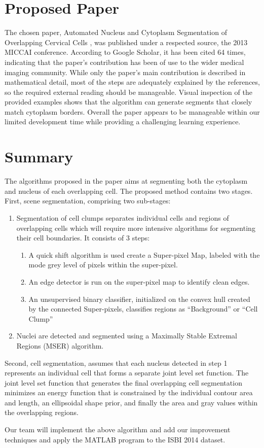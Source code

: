 \documentclass[12pt, letter]{article}
\begin{document}
\section{Proposed Paper}
The chosen paper, Automated Nucleus and Cytoplasm Segmentation of Overlapping Cervical Cells \cite{main}, was published under a respected source, the 2013 MICCAI conference.  According to Google Scholar, it has been cited 64 times, indicating that the paper’s contribution has been of use to the wider medical imaging community.  While only the paper’s main contribution is described in mathematical detail, most of the steps are adequately explained by the references, so the required external reading should be manageable.  Visual inspection of the provided examples shows that the algorithm can generate segments that closely match cytoplasm borders.  Overall the paper appears to be manageable within our limited development time while providing a challenging learning experience.

\section{Summary}

The algorithms proposed in the paper aims at segmenting both the cytoplasm and nucleus of each overlapping cell. The proposed method contains two stages. First, scene segmentation, comprising two sub-stages: 

\begin{enumerate}
    \item  Segmentation of cell clumps separates individual cells and regions of overlapping cells which will require more intensive algorithms for segmenting their cell boundaries.  It consists of 3 steps:
\begin{enumerate}
    \item A quick shift algorithm is used create a Super-pixel Map, labeled with the mode grey level of pixels within the super-pixel.
    \item An edge detector is run on the super-pixel map to identify clean edges.
    \item An unsupervised binary classifier, initialized on the convex hull created by the connected Super-pixels, classifies regions as “Background” or “Cell Clump”
\end{enumerate}
    \item Nuclei are detected and segmented using a Maximally Stable Extremal Regions (MSER) algorithm.
\end{enumerate}
Second, cell segmentation, assumes that each nucleus detected in step 1 represents an individual cell that forms a separate joint level set function.  
The joint level set function that generates the final overlapping cell segmentation minimizes an energy function that is constrained by the individual contour area and length, an ellipsoidal shape prior, and finally the area and gray values within the overlapping regions.

Our team will implement the above algorithm and add our improvement techniques and apply the MATLAB program to the ISBI 2014 dataset.  


\end{document}
